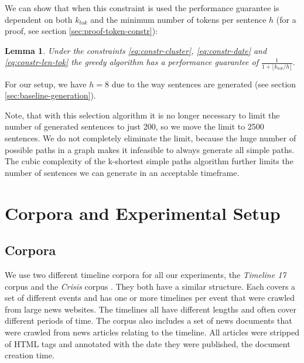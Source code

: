\documentclass[a4paper,BCOR=10mm]{report}
\newtheorem{lemma}{Lemma}
\numberwithin{lemma}{chapter}
\numberwithin{definition}{chapter}
\begin{document}
We can show that when this constraint is used the performance guarantee is dependent on both $k_{tok}$ and the minimum number of tokens per sentence $h$ (for a proof, see section \ref{sec:proof-token-constr}):
\begin{lemma}
Under the constraints \ref{eq:constr-cluster}, \ref{eq:constr-date} and \ref{eq:constr-len-tok} the greedy algorithm has a performance guarantee of $\frac{1}{1 + \lfloor k_{\mathit{tok}} / h \rfloor}$.
\end{lemma}

For our setup, we have $h = 8$ due to the way sentences are generated (see section \ref{sec:baseline-generation}).





Note, that with this selection algorithm it is no longer necessary to limit the number of generated sentences to just 200, so we move the limit to 2500 sentences.
We do not completely eliminate the limit, because the huge number of possible paths in a graph makes it infeasible to always generate all simple paths. The cubic complexity of the k-shortest simple paths algorithm further limits the number of sentences we can generate in an acceptable timeframe.

\chapter{Corpora and Experimental Setup} \label{sec:setup}

\section{Corpora} \label{sec:setup-corpora}

We use two different timeline corpora for all our experiments, the \textit{Timeline 17} corpus \citep{tran-tl17} and the \textit{Crisis} corpus \citep{tran-headlines}. They both have a similar structure. Each covers a set of different events and has one or more timelines per event that were crawled from large news websites. The timelines all have different lengths and often cover different periods of time. The corpus also includes a set of news documents that were crawled from news articles relating to the timeline. All articles were stripped of HTML tags and annotated with the date they were published, the document creation time.
\end{document}
